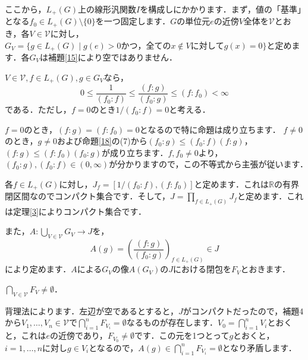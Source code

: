 ここから，$L_{+}(G)$上の線形汎関数$I$を構成しにかかります．まず，値の「基準」となる$f_{0} \in L_{+}(G) \setminus \{ 0 \}$を一つ固定します．$G$の単位元$e$の近傍$V$全体を$\mathscr{V}$とおき，各$V \in \mathscr{V}$に対し，$G_{V}=\{ g \in L_{+}(G) \mid g(e)>0 かつ，全ての x \not\in V に対してg(x)=0 \}$と定めます．各$G_V$は補題\ref{15}により空ではありません．

\begin{yprop}\label{19}
$V \in \mathscr{V}, f \in L_{+}(G), g \in G_{V}$なら，
\[
0 \le \frac{1}{( f_0 : f )} \le \frac{( f : g )}{( f_0 : g )} \le ( f : f_0 ) < \infty
\]
である．ただし，$f=0$のとき$1/( f_0 : f ) = 0$と考える．
\end{yprop}
\begin{Proof}
$f=0$のとき，$( f : g ) = ( f : f_0 ) = 0$となるので特に命題は成り立ちます．
$f \ne 0$のとき，$g \neq 0$および命題\ref{18}の(7)から$(f_0 : g) \le (f_0 : f) (f : g )$，$ (f : g) \le (f : f_0 ) (f_0 : g )$が成り立ちます．$f, f_0 \neq 0$より，$(f_0 : g), (f_0 : f) \in (0, \infty)$が分かりますので，この不等式から主張が従います．　
\end{Proof}

各$f \in L_{+}(G)$に対し，$J_{f}=[1/ ( f_0 : f ) , ( f : f_{0} )]$と定めます．これは$\mathbb{R}$の有界閉区間なのでコンパクト集合です．そして，$J=\prod_{f \in L_{+}(G)} J_f$と定めます．これは定理\ref{3}によりコンパクト集合です．

また，$A \colon \bigcup_{V \in \mathscr{V}}G_V \to J$を，
\[
A(g)=\left( \frac{( f : g )}{( f_0 : g )} \right)_{f \in L_{+}(G)} \in J
\]
により定めます．$A$による$G_V$の像$A(G_V)$の$J$における閉包を$F_V$とおきます．
\begin{yprop}\label{20}
$\bigcap_{V \in \mathscr{V}}F_V \neq \emptyset$．
\end{yprop}
\begin{Proof}
背理法によります．左辺が空であるとすると，$J$がコンパクトだったので，補題4から$V_1, \ldots , V_n \in \mathscr{V}$で$\bigcap_{i=1}^{n}F_{V_i}=\emptyset$なるものが存在します．$V_0=\bigcap_{i=1}^{n}V_i$とおくと，これは$e$の近傍であり，$F_{V_0} \neq \emptyset$です．この元を1つとって$g$とおくと，$i=1, \ldots , n$に対し$g \in V_i$となるので，$A(g) \in \bigcap_{i=1}^{n}F_{V_i}=\emptyset$となり矛盾します．　
\end{Proof}

